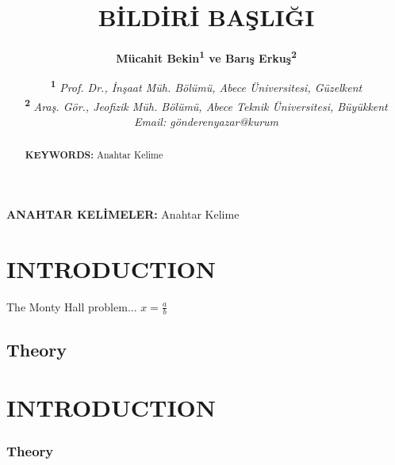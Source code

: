 \documentclass[english]{eqconf}
\title{BİLDİRİ BAŞLIĞI\vspace{2pt}}
\author{\textbf{%
		Mücahit Bekin\textsuperscript{1} ve
		Barış Erkuş\textsuperscript{2}\vspace{1pt}%
}}
\date{\small%
\textsuperscript{\textbf{1}}
\textit{Prof. Dr., İnşaat Müh. Bölümü, Abece Üniversitesi, Güzelkent}\\
\textsuperscript{\textbf{2}}
\textit{Araş. Gör., Jeofizik Müh. Bölümü, Abece Teknik Üniversitesi, 
Büyükkent}\\
\textit{Email: gönderenyazar@kurum}%
}
\begin{document}
 
\maketitle

\thispagestyle{firststyle}
 
\begin{ozet}   %
	
\blindtext

\textbf{ANAHTAR KELİMELER:} Anahtar Kelime

\end{ozet}

\begin{abstract} %
	
	\blindtext
	
\textbf{KEYWORDS:} Anahtar Kelime
	
\end{abstract}

\vspace{1em}
 
\section{INTRODUCTION}
 
The Monty Hall problem...
$x=\frac{a}{b}$
 
\subsection{Theory}

\blindtext

\section{INTRODUCTION}

\blindtext

\subsubsection*{Theory}

\blindtext

\blindtext

\blindtext

\blindtext

\blindtext

\blindtext

\blindtext

\blindtext

\blindtext

\blindtext
\end{document}
